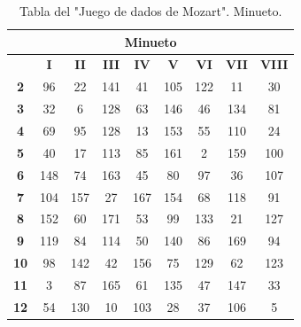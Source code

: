 \documentclass[a4paper, openright, 11pt, titlepage]{report}
\theoremstyle{definition}\newtheorem{defin}[propo]{Definition}
\theoremstyle{definition}\newtheorem{obser}[propo]{Remark}
\theoremstyle{definition}\newtheorem{ejem}[propo]{Ejemplo}
\theoremstyle{definition}\newtheorem{algoritmo}[propo]{Algoritmo}
\begin{document}
\begin{table}[H]
    \centering
    \begin{tabular}{|c|c|c|c|c|c|c|c|c|}
    \hline
    \multicolumn{9}{|c|}{Minueto}\\
    \hline \hline 
         & \textbf{I} & \textbf{II} & \textbf{III} & \textbf{IV} & \textbf{V} & \textbf{VI} & \textbf{VII} & \textbf{VIII}\\
         \hline
         \textbf{2} & 96 & 22 & 141 & 41 & 105 & 122 & 11 & 30\\
         \hline
         \textbf{3} & 32 & 6 & 128 & 63 & 146 & 46 & 134 & 81\\
         \hline
         \textbf{4} & 69 & 95 & 128 & 13 & 153 & 55 & 110 & 24\\
         \hline
         \textbf{5} & 40 & 17 & 113 & 85 & 161 & 2 & 159 & 100\\
         \hline
         \textbf{6} & 148 & 74 & 163 & 45 & 80 & 97 & 36 & 107\\
         \hline
         \textbf{7} & 104 & 157 & 27 & 167 & 154 & 68 & 118 & 91\\
         \hline
         \textbf{8} & 152 & 60 & 171 & 53 & 99 & 133 & 21 & 127\\
         \hline
         \textbf{9} & 119 & 84 & 114 & 50 & 140 & 86 & 169 & 94\\
         \hline
         \textbf{10} & 98 & 142 & 42 & 156 & 75 & 129 & 62 & 123\\
         \hline
         \textbf{11} & 3 & 87 & 165 & 61 & 135 & 47 & 147 & 33\\
         \hline
         \textbf{12} & 54 & 130 & 10 & 103 & 28 & 37 & 106 & 5\\
         \hline
    \end{tabular}
    \caption{Tabla del "Juego de dados de Mozart". Minueto.}
\end{table}
\end{document}
